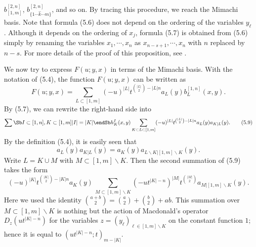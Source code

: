 $b^{[2,n]}_{[1,m]}$,
$b^{[2,n]}_{\{1\cdots \hat{k}\cdots m\}}$, and so on. 
By tracing this procedure, we reach the Mimachi basis.  
%
\noindent 
Note that formula (5.6) does not depend on the ordering 
of the variables $y_\ell$. 
Although it depends on the ordering of $x_j$, 
formula (5.7) is obtained from (5.6) simply by renaming 
the variables $x_1,\cdots,x_n$ as $x_{n-s+1},\cdots,x_n$
with $n$ replaced by $n-s$.  
For more details of the proof of this proposition, see \cite{MN2}. 
\par
We now try to express $F(u;y,x)$ in terms of the Mimachi basis. 
With the notation of (5.4), the function $F(u;y,x)$ can be written 
as 
$$
F(u;y,x)=\sum_{L\subset[1,m]}
(-u)^{|L|} t^{\binom{|L|}{2}-|L|n} 
a_{L}(y) b^{[1,n]}_L(x,y). 
\tag{5.8}
$$
By (5.7), we can rewrite the right-hand side into
$$
\sum\Sb I\subset[1,n],K\subset{[1,m]} \\ |I|=|K|\endSb
h^{I}_{K}(x,y) 
\sum_{K\subset L\subset[1,m]}
(-u)^{|L|} t^{\binom{|L|}{2}-|L|n} a_{L}(y) a_{K|L}(y). \tag{5.9}
$$
By the definition (5.4), it is easily seen that
$$
a_{L}(y) a_{K|L}(y)=a_{K}(y) 
a_{L\backslash K| [1,m]\backslash K}(y). 
\tag{5.10}
$$
Write $L=K\cup M$ with $M\subset[1,m]\backslash K$. 
Then the second summation of (5.9) takes the form
$$
(-u)^{|K|} t^{\binom{|K|}{2}-|K|n } a_{K}(y)
\,\sum_{M\subset[1,m]\backslash K}
(-ut^{|K|-n})^{|M|} t^{\binom{|M|}{2}}a_{M|[1,m]\backslash K}(y). 
\tag{5.11}
$$
Here we used the identity $\binom{a+b}{2}=\binom{a}{2}+\binom{b}{2}+ab$. 
This summation over $M\subset[1,m]\backslash K$ 
is nothing but the action of Macdonald's operator 
$D_{z}(ut^{|K|-n})$ 
for the variables $z=(y_\ell)_{\ell\in[1,m]\backslash K}$ 
on the constant function $1$; hence it is equal to $(ut^{|K|-n};t)_{m-|K|}$. 
